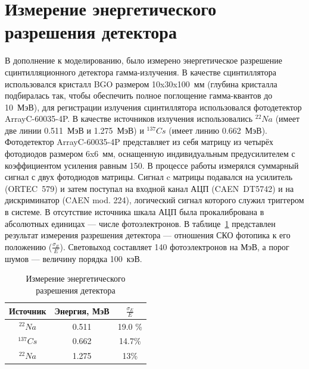 \documentclass[a4paper]{panl}
\begin{document}
\newpage
\section*{Измерение энергетического разрешения детектора}
В дополнение к моделированию, было измерено энергетическое разрешение сцинтилляционного детектора гамма-излучения. В качестве сцинтиллятора использовался кристалл BGO размером 10x30x100~мм (глубина кристалла подбиралась так, чтобы обеспечить полное поглощение гамма-квантов до 10~МэВ), для регистрации излучения сцинтиллятора использовался фотодетектор ArrayC-60035-4P. В качестве источников излучения использовались $^{22}Na$ (имеет две линии 0.511~МэВ и 1.275~МэВ) и $^{137}Cs$ (имеет линию 0.662~МэВ). Фотодетектор ArrayC-60035-4P  представляет из себя матрицу из четырёх фотодиодов размером 6x6~мм, оснащенную индивидуальным предусилителем с коэффициентом усиления равным 150. В процессе работы измерялся суммарный сигнал с двух фотодиодов матрицы. Сигнал c матрицы подавался на усилитель (ORTEC~579) и затем поступал на входной канал АЦП (CAEN~DT5742) и на дискриминатор (CAEN mod. 224), логический сигнал которого служил триггером в системе. В отсутствие источника шкала АЦП была прокалибрована в абсолютных единицах --- числе фотоэлектронов. В таблице~\ref{tab:ex} представлен результат измерения разрешения детектора ---  отношения СКО фотопика к его положению ($\frac{\sigma_E}{E}$). Световыход составляет 140 фотоэлектронов на МэВ, а порог шумов --- величину порядка 100~кэВ.\\
\begin{table}
    \caption{Измерение энергетического разрешения детектора}
    \label{tab:ex}
    \begin{center} 
        \begin{tabular}[c]{|c|c|c|}
            \hline 
            Источник & Энергия, МэВ & $\frac{\sigma_E}{E}$\\
            \hline 
            $^{22}Na$&0.511 & 19.0 \%  \\ 
            \hline 
            $^{137}Cs$&0.662 & 14.7\%\\ 
            \hline 
            $^{22}Na$& 1.275 & 13\% \\
            \hline 
        \end{tabular} 
    \end{center}
\end{table}
\end{document}
